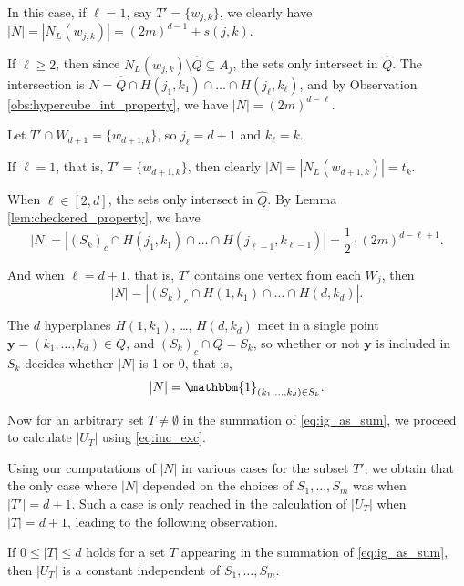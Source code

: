 \documentclass[10pt,a4paper]{article}
\numberwithin{equation}{section}
\begin{document}
\begin{description}[style=nextline,leftmargin=1em]
	\item[Case 1: $T'\cap W_{d+1}=\emptyset$.]
    In this case, if $\ell=1$, say $T'=\{w_{j,k}\}$, we clearly have $|N|=|N_L(w_{j,k})|=(2m)^{d-1}+s(j,k)$.

    If $\ell\ge 2$, then since $N_L(w_{j,k})\setminus \widehat{Q}\subseteq A_j$, the sets only intersect in $\widehat{Q}$. The intersection is $N = \widehat{Q}\cap H(j_1, k_1)\cap \ldots\cap H(j_{\ell},k_{\ell})$,
    and by Observation \ref{obs:hypercube_int_property}, we have $|N|=(2m)^{d-\ell}$.

    \item[Case 2: $T'\cap W_{d+1}\ne\emptyset$.]
    Let $T'\cap W_{d+1}=\{w_{d+1, k}\}$, so $j_{\ell}=d+1$ and $k_{\ell}=k$.

    If $\ell=1$, that is, $T'=\{w_{d+1,k}\}$, then clearly $|N|=|N_L(w_{d+1,k})|=t_k$.

    When $\ell\in [2,d]$, the sets only intersect in $\widehat{Q}$. By Lemma \ref{lem:checkered_property}, we have
    $$|N|=|(S_k)_c\cap H(j_1,k_1)\cap \ldots\cap H(j_{\ell-1},k_{\ell-1})|=\frac12\cdot (2m)^{d-\ell+1}.$$

    And when $\ell=d+1$, that is, $T'$ contains one vertex from each $W_j$, then
    $$|N|=|(S_k)_c\cap H(1,k_1)\cap \ldots\cap H(d,k_d)|.$$

    The $d$ hyperplanes $H(1,k_1)$, \ldots, $H(d,k_d)$ meet in a single point $\mathbf{y}=(k_1,\ldots,k_d)\in Q$, and $(S_k)_c\cap Q=S_k$, so whether or not $\mathbf{y}$ is included in $S_k$ decides whether $|N|$ is 1 or 0, that is,
    $$|N|=\mathbbm{1}_{(k_1, \ldots, k_d)\in S_k}.$$
\end{description}

\noindent Now for an arbitrary set $T\ne \emptyset$ in the summation of \eqref{eq:ig_as_sum}, we proceed to calculate $|U_T|$ using \eqref{eq:inc_exc}.

Using our computations of $|N|$ in various cases for the subset $T'$, we obtain that the only case where $|N|$ depended on the choices of $S_1,\ldots,S_m$ was when $|T'|=d+1$. Such a case is only reached in the calculation of $|U_T|$ when $|T|=d+1$, leading to the following observation.

\begin{observation}\label{obs:us_constant_if}
If $0\le |T|\le d$ holds for a set $T$ appearing in the summation of \eqref{eq:ig_as_sum}, then $|U_T|$ is a constant independent of $S_1,\ldots,S_m$.
\end{observation}
\end{document}
